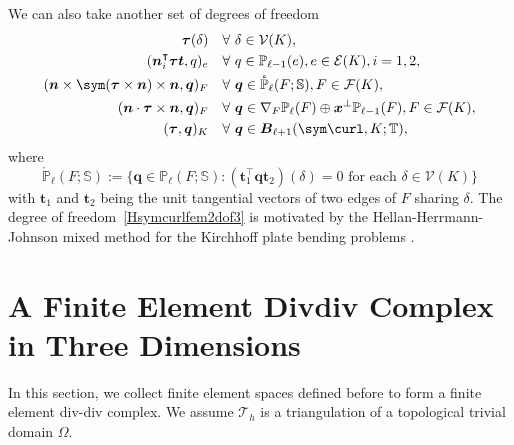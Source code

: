 We can also take another set of degrees of freedom
\begin{align}
\boldsymbol \tau(\delta) & \quad\forall~\delta\in \mathcal V(K), \label{Hsymcurlfem2dof1}\\
(\boldsymbol  n_i^{\intercal}\boldsymbol \tau\boldsymbol t, q)_e & \quad\forall~q\in\mathbb P_{\ell-1}(e),  e\in\mathcal E(K), i=1,2,\label{Hsymcurlfem2dof2}\\
(\boldsymbol n\times \sym(\boldsymbol\tau\times\boldsymbol n)\times \boldsymbol n, \boldsymbol q)_F &\quad\forall~\boldsymbol q\in\mathring{\mathbb P}_{\ell}(F;\mathbb S), F\in\mathcal F(K),\label{Hsymcurlfem2dof3}\\
(\boldsymbol n\cdot \boldsymbol\tau\times\boldsymbol n, \boldsymbol q)_F & \quad\forall~\boldsymbol q\in\nabla_F\mathbb P_{\ell}(F)\oplus\boldsymbol x^{\perp}\mathbb P_{\ell-1}(F),  F\in\mathcal F(K),\label{Hsymcurlfem2dof4}\\
(\boldsymbol \tau, \boldsymbol q)_K & \quad\forall~\boldsymbol q\in\boldsymbol B_{\ell+1}(\sym\curl, K;\mathbb T), \label{Hsymcurlfem2dof5} 
\end{align}
where 
$$
\mathring{\mathbb P}_{\ell}(F;\mathbb S):=\{\boldsymbol q\in\mathbb P_{\ell}(F;\mathbb S): (\boldsymbol t_1^{\intercal}\boldsymbol q\boldsymbol t_2)(\delta)=0\textrm{ for each } \delta\in\mathcal V(K)\}
$$
with $\boldsymbol t_1$ and $\boldsymbol t_2$ being the unit tangential vectors of two edges of $F$ sharing $\delta$.
The degree of freedom~\eqref{Hsymcurlfem2dof3} is motivated by the Hellan-Herrmann-Johnson mixed method for the Kirchhoff plate bending problems \cite{Hellan1967,Herrmann1967,Johnson1973}.




\section{A Finite Element Divdiv Complex in Three Dimensions}\label{sec:femdivdivcomplex}
In this section, we collect finite element spaces defined before to form a finite element div-div complex. We assume $\mathcal T_h$ is a triangulation of a topological trivial domain $\Omega$. 


